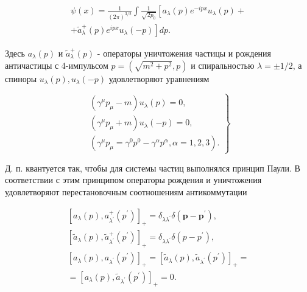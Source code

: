 \documentclass[10pt]{article}
\begin{document}
\[

\begin{gathered}

\psi(x)=\frac{1}{(2 \pi)^{3 / 2}} \int \frac{1}{\sqrt{2 p_{0}}}\left[a_{\lambda}(p) e^{-i p x} u_{\lambda}(p)+\right. \\

\left.+\tilde{a}_{\lambda}^{+}(p) e^{i p x} u_{\lambda}(-p)\right] d p .

\end{gathered}

\]



Здесь $a_{\lambda}(p)$ и $\tilde{a}_{\lambda}^{+}(p)$ - операторы уничтожения частицы и рождения античастицы с 4-импульсом $p=\left(\sqrt{m^{2}+p^{2}}, p\right)$ и спиральностью $\lambda= \pm 1 / 2$, а спиноры $u_{\lambda}(p), u_{\lambda}(-p)$ удовлетворяют уравнениям



\[

\left.\begin{array}{c}

\left(\gamma^{\mu} p_{\mu}-m\right) u_{\lambda}(p)=0, \\

\left(\gamma^{\mu} p_{\mu}+m\right) u_{\lambda}(-p)=0, \\

\left(\gamma^{\mu} p_{\mu}=\gamma^{0} p^{0}-\gamma^{\alpha} p^{\alpha}, \alpha=1,2,3\right) .

\end{array}\right\}

\]



Д. п. квантуется так, чтобы для системы частиц выполнялся принцип Паули. В соответствии с этим принципом операторы рождения и уничтожения удовлетворяют перестановочным соотношениям антикоммутации



\[

\begin{gathered}

{\left[a_{\lambda}(p), a_{\lambda^{\prime}}^{+}\left(p^{\prime}\right)\right]_{+}=\delta_{\lambda \lambda^{\prime}} \delta\left(\boldsymbol{p}-\boldsymbol{p}^{\prime}\right),} \\

{\left[\tilde{a}_{\lambda}(p), \tilde{a}_{\lambda^{\prime}}^{+}\left(p^{\prime}\right)\right]_{+}=\delta_{\lambda \lambda^{\prime}} \delta\left(p-p^{\prime}\right),} \\

{\left[a_{\lambda}(p), a_{\lambda^{\prime}}\left(p^{\prime}\right)\right]_{+}=\left[\tilde{a}_{\lambda}(p), \tilde{a}_{\lambda^{\prime}}\left(p^{\prime}\right)\right]_{+}=} \\

=\left[a_{\lambda}(p), \tilde{a}_{\lambda^{\prime}}\left(p^{\prime}\right)\right]_{+}=0 .

\end{gathered}

\]
\end{document}
